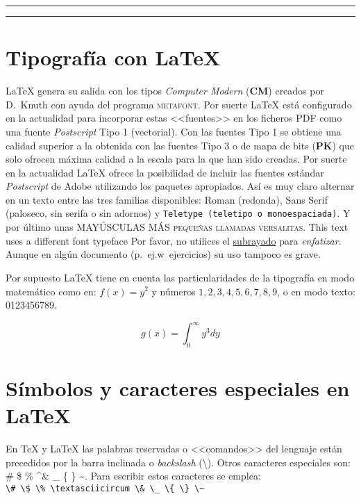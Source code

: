 
\hrule %

\tableofcontents %
\vspace{0.5cm} %
\hrule

\section{Tipografía con \LaTeX{}}
\label{sec:tipos} %
\LaTeX{} genera su salida con los tipos \emph{Computer Modern} (\textbf{CM}) creados por D.~Knuth con ayuda del programa \textsc{metafont}. Por suerte \LaTeX{} está configurado en la actualidad para incorporar estas <<fuentes>> en los ficheros PDF como una fuente \emph{Postscript} Tipo 1 (vectorial). Con las fuentes Tipo 1 se obtiene una calidad superior a la obtenida con las fuentes Tipo 3 o de mapa de bits (\textbf{PK}) que solo ofrecen máxima calidad a la escala para la que han sido creadas. Por suerte en la actualidad \LaTeX{} ofrece la posibilidad de incluir las fuentes estándar \emph{Postscript} de \textsf{Adobe} utilizando los paquetes apropiados. Así es muy claro alternar en un texto entre las tres familias disponibles: Roman (redonda), \textsf{Sans Serif (paloseco, sin serifa o sin adornos)} y \texttt{Teletype (teletipo o monoespaciada)}. Y por último unas MAYÚSCULAS MÁS \textsc{pequeñas llamadas versalitas}. {\selectfont
This text uses a different font typeface
}
Por favor, no utilices el \underline{subrayado} para \emph{enfatizar}. Aunque en algún documento (p.~ej.w\ ejercicios) su uso tampoco es grave.

Por supuesto \LaTeX{} tiene en cuenta las particularidades de la tipografía en modo matemático como en: $f(x)=y^2$ y números $1,2,3,4,5,6,7,8,9$, o en modo texto: 0123456789.

$$g(x)=\int_{0}^{\infty}y^{3}dy$$



\section[Símbolos]{Símbolos y caracteres especiales en \LaTeX{}}
\label{sec:simb} %

En \TeX{} y \LaTeX{} las palabras reservadas o <<comandos>> del lenguaje están precedidos por la barra inclinada o \emph{backslash} (\textbackslash). Otros caracteres especiales son: \# \$ \% \textasciicircum \& \_ \{ \} \~{}. Para escribir estos caracteres se emplea:\\
\verb!\# \$ \% \textasciicircum \& \_ \{ \} \~!

